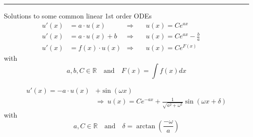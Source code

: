 \hrule{}

Solutions to some common linear 1st order ODEs
\begin{align*}
    u'(x) & = a \cdot u(x)     & \Rightarrow & \quad u(x)=Ce^{ax}             &  &   \\
    u'(x) & = a \cdot u(x) + b & \Rightarrow & \quad u(x)=Ce^{ax}-\frac{b}{a} &  &   \\
    u'(x) & = f(x) \cdot u(x)  & \Rightarrow & \quad u(x) = Ce^{F(x)}         &  & 
\end{align*}
with
\begin{equation*}
    a,b,C \in \mathbb{R} \quad \text{and} \quad F(x) = \int f(x)dx
\end{equation*}

\begin{align*}
    u'(x) = -a\cdot u(x) & + \sin(\omega x)                                                                    \\
                         & \Rightarrow \: u(x)=Ce^{-ax}+\frac{1}{\sqrt{a^2 + \omega^2}}\sin(\omega x + \delta)
\end{align*}
with
\begin{equation*}
    a, C \in \mathbb{R} \quad \text{and} \quad  \delta = \arctan\left(\frac{-\omega}{a}\right)
\end{equation*}



